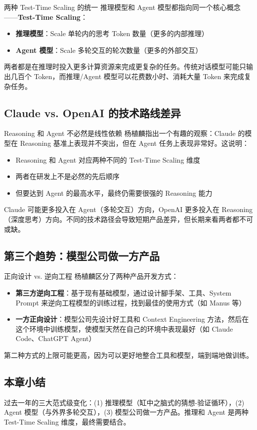 \begin{importantbox}{两种 Test-Time Scaling 的统一}
推理模型和 Agent 模型都指向同一个核心概念——\textbf{Test-Time Scaling}：
\begin{itemize}
    \item \textbf{推理模型}：Scale 单轮内的思考 Token 数量（更多的内部推理）
    \item \textbf{Agent 模型}：Scale 多轮交互的轮次数量（更多的外部交互）
\end{itemize}
两者都是在推理时投入更多计算资源来完成更复杂的任务。传统对话模型可能只输出几百个 Token，而推理/Agent 模型可以花费数小时、消耗大量 Token 来完成复杂任务。
\end{importantbox}

\subsection{Claude vs. OpenAI 的技术路线差异}

\begin{knowledgebox}{Reasoning 和 Agent 不必然是线性依赖}
杨植麟指出一个有趣的观察：Claude 的模型在 Reasoning 基准上表现并不突出，但在 Agent 任务上表现非常好。这说明：
\begin{itemize}
    \item Reasoning 和 Agent 对应两种不同的 Test-Time Scaling 维度
    \item 两者在研发上不是必然的先后顺序
    \item 但要达到 Agent 的最高水平，最终仍需要很强的 Reasoning 能力
\end{itemize}
Claude 可能更多投入在 Agent（多轮交互）方向，OpenAI 更多投入在 Reasoning（深度思考）方向。不同的技术路径会导致短期产品差异，但长期来看两者都不可或缺。
\end{knowledgebox}

\subsection{第三个趋势：模型公司做一方产品}

\begin{importantbox}{正向设计 vs. 逆向工程}
杨植麟区分了两种产品开发方式：
\begin{itemize}
    \item \textbf{第三方逆向工程}：基于现有基础模型，通过设计腳手架、工具、System Prompt 来逆向工程模型的训练过程，找到最佳的使用方式（如 Manus 等）
    \item \textbf{一方正向设计}：模型公司先设计好工具和 Context Engineering 方法，然后在这个环境中训练模型，使模型天然在自己的环境中表现最好（如 Claude Code、ChatGPT Agent）
\end{itemize}
第二种方式的上限可能更高，因为可以更好地整合工具和模型，端到端地做训练。
\end{importantbox}

\subsection{本章小结}

过去一年的三大范式级变化：(1) 推理模型（缸中之脑式的猜想-验证循环），(2) Agent 模型（与外界多轮交互），(3) 模型公司做一方产品。推理和 Agent 是两种 Test-Time Scaling 维度，最终需要结合。


